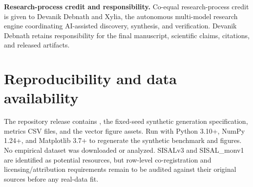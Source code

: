 \documentclass[11pt,a4paper]{article}
\begin{document}
\vspace{0.6em}\noindent\textbf{Research-process credit and responsibility.} Co-equal research-process credit is given to Devanik Debnath and Xylia, the autonomous multi-model research engine coordinating AI-assisted discovery, synthesis, and verification. Devanik Debnath retains responsibility for the final manuscript, scientific claims, citations, and released artifacts.

\section*{Reproducibility and data availability}
The repository release contains \texttt{}, the fixed-seed synthetic generation specification, metrics CSV files, and the vector figure assets. Run \texttt{} with Python 3.10+, NumPy 1.24+, and Matplotlib 3.7+ to regenerate the synthetic benchmark and figures. No empirical dataset was downloaded or analyzed. SISALv3 and SISAL\_monv1 are identified as potential resources, but row-level co-registration and licensing/attribution requirements remain to be audited against their original sources before any real-data fit.



\end{document}
